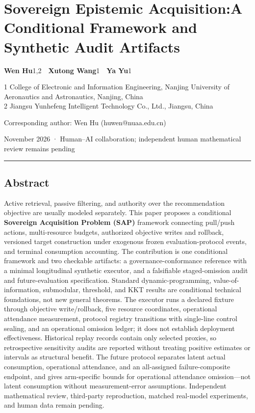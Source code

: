 \documentclass[
  11pt]{article}
\author{}
\date{22 November 2026}
\begin{document}
\section{\texorpdfstring{Sovereign Epistemic Acquisition:\newline A
Conditional Framework and Synthetic Audit
Artifacts}{Sovereign Epistemic Acquisition:A Conditional Framework and Synthetic Audit Artifacts}}\label{sovereign-epistemic-acquisitiona-conditional-framework-and-synthetic-audit-artifacts}

\textbf{Wen Hu}1,2~~\textbf{Xutong Wang}1~~\textbf{Ya Yu}1

1 College of Electronic and Information Engineering, Nanjing University
of Aeronautics and Astronautics, Nanjing, China\\
2 Jiangsu Yunhefeng Intelligent Technology Co., Ltd., Jiangsu, China

Corresponding author: Wen Hu (huwen@nuaa.edu.cn)

November 2026 · Human--AI collaboration; independent human mathematical
review remains pending

\begin{center}\rule{0.5\linewidth}{0.5pt}\end{center}

\subsection{Abstract}\label{abstract}

Active retrieval, passive filtering, and authority over the
recommendation objective are usually modeled separately. This paper
proposes a conditional \textbf{Sovereign Acquisition Problem (SAP)}
framework connecting pull/push actions, multi-resource budgets,
authorized objective writes and rollback, versioned target construction
under exogenous frozen evaluation-protocol events, and terminal
consumption accounting. The contribution is one conditional framework
and two checkable artifacts: a governance-conformance reference with a
minimal longitudinal synthetic executor, and a falsifiable
staged-omission audit and future-evaluation specification. Standard
dynamic-programming, value-of-information, submodular, threshold, and
KKT results are conditional technical foundations, not new general
theorems. The executor runs a declared fixture through objective
write/rollback, five resource coordinates, operational attendance
measurement, protocol registry transitions with single-line control
sealing, and an operational omission ledger; it does not establish
deployment effectiveness. Historical replay records contain only
selected proxies, so retrospective sensitivity audits are reported
without treating positive estimates or intervals as structural benefit.
The future protocol separates latent actual consumption, operational
attendance, and an all-assigned failure-composite endpoint, and gives
arm-specific bounds for operational attendance omission---not latent
consumption without measurement-error assumptions. Independent
mathematical review, third-party reproduction, matched real-model
experiments, and human data remain pending.
\end{document}
